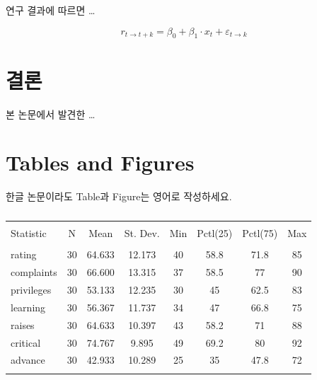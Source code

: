 \documentclass[12pt,]{article}
\begin{document}
연구 결과에 따르면 \ldots{}

\[ r_{t \rightarrow t+k}= \beta_0 + \beta_1 \cdot x_t +\varepsilon_{t \rightarrow k} \]

\hypertarget{uxacb0uxb860}{%
\section{결론}\label{uxacb0uxb860}}

본 논문에서 발견한 \ldots{}

\newpage

\hypertarget{tables-and-figures}{%
\section{Tables and Figures}\label{tables-and-figures}}

한글 논문이라도 Table과 Figure는 영어로 작성하세요.

\begin{table}[!htbp] \centering 
  \caption{} 
  \label{} 
\begin{tabular}{@{\extracolsep{5pt}}lccccccc} 
\\[-1.8ex]\hline 
\hline \\[-1.8ex] 
Statistic & \multicolumn{1}{c}{N} & \multicolumn{1}{c}{Mean} & \multicolumn{1}{c}{St. Dev.} & \multicolumn{1}{c}{Min} & \multicolumn{1}{c}{Pctl(25)} & \multicolumn{1}{c}{Pctl(75)} & \multicolumn{1}{c}{Max} \\ 
\hline \\[-1.8ex] 
rating & 30 & 64.633 & 12.173 & 40 & 58.8 & 71.8 & 85 \\ 
complaints & 30 & 66.600 & 13.315 & 37 & 58.5 & 77 & 90 \\ 
privileges & 30 & 53.133 & 12.235 & 30 & 45 & 62.5 & 83 \\ 
learning & 30 & 56.367 & 11.737 & 34 & 47 & 66.8 & 75 \\ 
raises & 30 & 64.633 & 10.397 & 43 & 58.2 & 71 & 88 \\ 
critical & 30 & 74.767 & 9.895 & 49 & 69.2 & 80 & 92 \\ 
advance & 30 & 42.933 & 10.289 & 25 & 35 & 47.8 & 72 \\ 
\hline \\[-1.8ex] 
\end{tabular} 
\end{table}

\newpage
\end{document}
